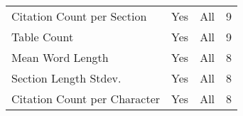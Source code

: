\begin{table}[htbp]
\begin{tabular}{m{} c c c}
        Citation Count per Section & Yes & All & 9 \\
        Table Count & Yes & All & 9 \\
        Mean Word Length & Yes & All & 8 \\
        Section Length Stdev. & Yes & All & 8 \\
        Citation Count per Character & Yes & All & 8 \\
        \bottomrule
    \end{tabular}
\end{table}